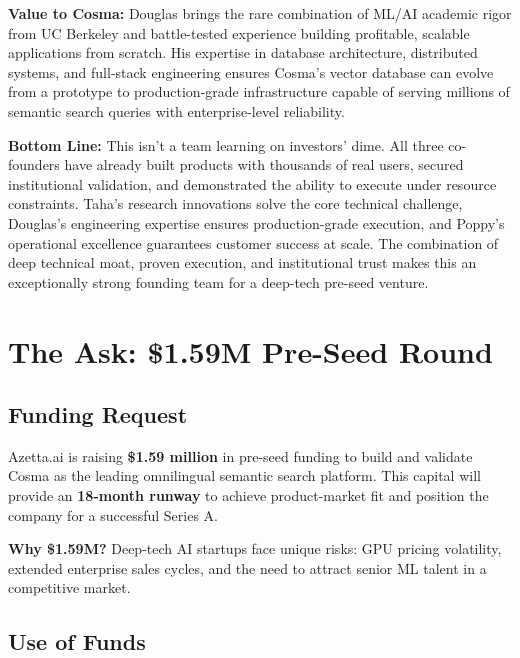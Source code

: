 \textbf{Value to Cosma:} Douglas brings the rare combination of ML/AI academic rigor from UC Berkeley and battle-tested experience building profitable, scalable applications from scratch. His expertise in database architecture, distributed systems, and full-stack engineering ensures Cosma's vector database can evolve from a prototype to production-grade infrastructure capable of serving millions of semantic search queries with enterprise-level reliability.


\textbf{Bottom Line:} This isn't a team learning on investors' dime. All three co-founders have already built products with thousands of real users, secured institutional validation, and demonstrated the ability to execute under resource constraints. Taha's research innovations solve the core technical challenge, Douglas's engineering expertise ensures production-grade execution, and Poppy's operational excellence guarantees customer success at scale. The combination of deep technical moat, proven execution, and institutional trust makes this an exceptionally strong founding team for a deep-tech pre-seed venture.


\section{The Ask: \$1.59M Pre-Seed Round}

\subsection{Funding Request}

Azetta.ai is raising \textbf{\$1.59 million} in pre-seed funding to build and validate Cosma as the leading omnilingual semantic search platform. This capital will provide an \textbf{18-month runway} to achieve product-market fit and position the company for a successful Series A.

\textbf{Why \$1.59M?} Deep-tech AI startups face unique risks: GPU pricing volatility, extended enterprise sales cycles, and the need to attract senior ML talent in a competitive market.

\subsection{Use of Funds}

